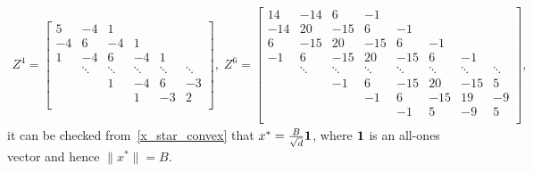 \documentclass{osudissert96}
\DeclareMathOperator*{\argmin}{arg\,min}
\begin{document}
{\footnotesize
\begin{align}\label{coup_matrices_4_6}
Z^4=
\begin{bmatrix}
 5& -4 & 1 &  & &\\
 -4& 6  &-4 &1  & &\\
 1& -4 & 6 & -4 & 1&\\
  &  \ddots&  \ddots&  \ddots &  \ddots & \ddots\\
   &  & 1& -4 &  6& -3 \\
  &  & & 1 & -3 & 2\\ 
\end{bmatrix},\;
Z^6=
\begin{bmatrix}
 14& -14 & 6 & -1 & & & &\\
 -14& 20  &-15 & 6   & -1 & &&\\
 6& -15 & 20 & -15 & 6& -1&&\\
 -1&6& -15 & 20 & -15 & 6& -1&\\
&   \ddots&  \ddots&  \ddots&  \ddots &  \ddots & \ddots& \ddots\\
&& -1 & 6 & -15& 20 &  -15& 5 \\
 &&  &  -1& 6& -15 &  19& -9 \\
  && &  &-1 & 5 & -9 & 5\\
\end{bmatrix},
\end{align}}
 \hspace{-0.15cm}it can be checked from~\cref{x_star_convex}  that $x^* = \frac{B}{\sqrt{d}} {\bf 1}$, where $\bf 1$ is an all-ones vector and hence $\|x^*\|=B$. 
\end{document}
